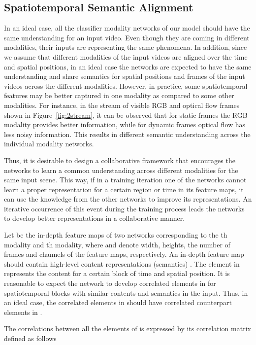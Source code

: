 \documentclass[10pt,twocolumn,letterpaper]{article}
\begin{document}
\subsection{Spatiotemporal Semantic Alignment}
In an ideal case, all the  classifier modality networks of our model should have the same understanding for an input video.  Even though they are coming in different modalities, their inputs are representing the same phenomena. In addition, since we assume that different modalities of the input videos are aligned over the time and spatial positions, in an ideal case the networks are expected to have the same understanding and share semantics for spatial positions and frames of the input videos across the different modalities. However, in practice, some spatiotemporal features may be better captured in one modality as compared to some other modalities. For instance, in the stream of visible RGB and optical flow frames shown in Figure~\ref{fig:2stream}, it can be observed that for static frames the RGB modality provides better information, while for dynamic frames optical flow has less noisy information. This results in different semantic understanding across the individual modality networks.

Thus, it is desirable to design a collaborative framework that encourages the networks to learn a common understanding across different modalities for the same input scene.  This way, if in a training iteration one of the networks cannot learn a proper representation for a certain region or time in its feature maps, it can use the knowledge from the other networks to improve its representations.  An iterative occurrence of this event during the training process leads the networks to develop better representations in a collaborative manner. 


Let  be the in-depth feature maps of two networks corresponding to the th modality and th modality, where  and  denote width, heights, the number of frames and channels of the feature maps, respectively.   An in-depth feature map should contain high-level content representations (semantics) \cite{gatys2016image}. The element  in  represents the content for a certain block of time and spatial position.   It is reasonable to expect the network  to develop correlated elements in  for spatiotemporal blocks with similar contents and semantics in the input.  Thus, in an ideal case, the correlated elements in  should have correlated counterpart elements in .

The correlations between all the elements of  is expressed by its correlation matrix defined as follows
\end{document}
